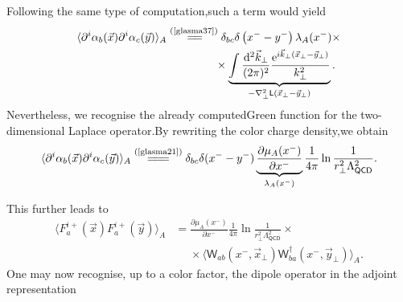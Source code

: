 \begin{note}
    Following the same type of computation,such a term would yield
    \begin{align*}
        \langle\partial^{i} \alpha_{b}(\vec{x}) \partial^{i} \alpha_{c}(\vec{y})\rangle_A&\stackrel{(\text{\cref{glasma37}})}{=\joinrel=\joinrel}\delta_{bc}\delta\left(x^--y^-\right)\lambda_A(x^-)\times\\
        &\phantom{\stackrel{(\text{\cref{glasma37}})}{=\joinrel=\joinrel}}\times\underbrace{\int \frac{\mathrm{d}^{2} \vec{k}_{\perp}}{(2 \pi)^{2}} \frac{\mathrm{e}^{i \vec{k}_{\perp}(\vec{x}_\perp-\vec{y}_\perp)}}{k_{\perp}^2}}_{-\nabla_\perp^2\textsf{L}(\vec{x}_\perp-\vec{y}_\perp)}.
    \end{align*}
    Nevertheless, we recognise the already computedGreen function for the two-dimensional Laplace operator.By rewriting the color charge density,we obtain
    \begin{align*}
        \langle\partial^{i} \alpha_{b}(\vec{x}) \partial^{i} \alpha_{c}(\vec{y})\rangle_A\stackrel{(\text{\cref{glasma21}})}{=\joinrel=\joinrel=}\delta_{bc}\delta(x^--y^-)\underbrace{\frac{\partial\mu_A(x^-)}{\partial x^-}}_{\lambda_A(x^-)}\frac{1}{4\pi}\ln{\frac{1}{r_\perp^2\Lambda_{\textsf{QCD}}^2}}.
    \end{align*}
\end{note}

This further leads to 
\begin{equation}\label{glasma48}
    \begin{aligned}
    \langle F^{i+}_a(\vec{x})F^{i+}_a(\vec{y})\rangle_A&=\frac{\partial\mu_A(x^-)}{\partial x^-}\frac{1}{4\pi}\ln{\frac{1}{r_\perp^2\Lambda_{\textsf{QCD}}^2}}\times\\
    &\phantom{=}\times\langle \textsf{W}_{ab}(x^-,\vec{x}_\perp) \textsf{W}_{ba}^\dagger(x^-,\vec{y}_\perp)\rangle_A.
    \end{aligned}
\end{equation}
One may now recognise, up to a color factor, the dipole operator in the adjoint representation

